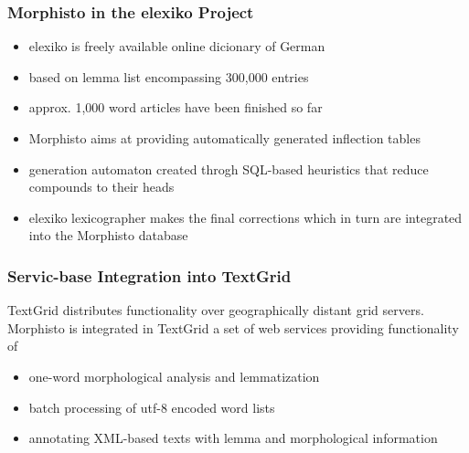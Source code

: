 \documentclass {beamer}
\begin{document}
\frame
{
  \frametitle{Morphisto in the elexiko Project}  
\begin{itemize}
 \item elexiko is freely available online dicionary of German
 \item based on lemma list encompassing 300,000 entries
 \item approx. 1,000 word articles have been finished so far
 \item Morphisto aims at providing automatically generated inflection tables 
 \item generation automaton created throgh SQL-based heuristics that reduce compounds to their heads
 \item elexiko lexicographer makes the final corrections which in turn are integrated into the Morphisto database
\end{itemize}
}

\frame
{  \frametitle{Servic-base Integration into TextGrid}
TextGrid distributes functionality over geographically distant grid servers.\\
Morphisto is integrated in TextGrid a set of web services providing functionality of
\begin{itemize} 
\item one-word morphological analysis and lemmatization
\item batch processing of utf-8 encoded word lists
\item annotating XML-based texts with lemma and morphological information
\end{itemize}
}
\end{document}
